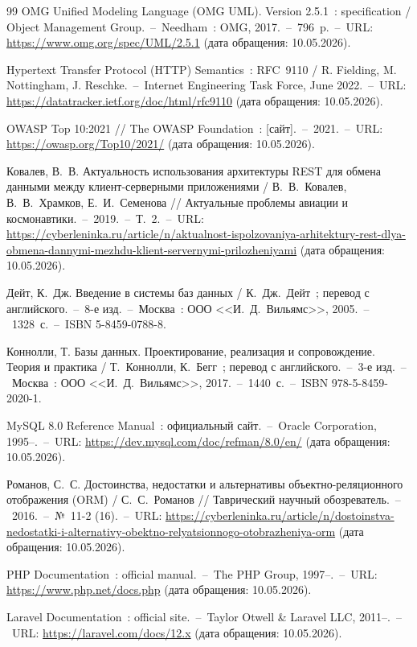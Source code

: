 \begin{thebibliography}{99}
 OMG Unified Modeling Language (OMG UML). Version 2.5.1~: specification / Object Management Group.~--~Needham~: OMG, 2017.~--~796~p.~--~URL: \url{https://www.omg.org/spec/UML/2.5.1} (дата обращения: 10.05.2026).

 Hypertext Transfer Protocol (HTTP) Semantics~: RFC~9110 / R. Fielding, M. Nottingham, J. Reschke.~--~Internet Engineering Task Force, June 2022.~--~URL: \url{https://datatracker.ietf.org/doc/html/rfc9110} (дата обращения: 10.05.2026).

 OWASP Top 10:2021 // The OWASP Foundation~: [сайт].~--~2021.~--~URL: \url{https://owasp.org/Top10/2021/} (дата обращения: 10.05.2026).

 Ковалев, В.~В. Актуальность использования архитектуры REST для обмена данными между клиент-серверными приложениями / В.~В.~Ковалев, В.~В.~Храмков, Е.~И.~Семенова // Актуальные проблемы авиации и космонавтики.~--~2019.~--~Т.~2.~--~URL: \url{https://cyberleninka.ru/article/n/aktualnost-ispolzovaniya-arhitektury-rest-dlya-obmena-dannymi-mezhdu-klient-servernymi-prilozheniyami} (дата обращения: 10.05.2026).

 Дейт, К.~Дж. Введение в системы баз данных / К.~Дж.~Дейт~; перевод с английского.~--~8-е изд.~--~Москва~: ООО <<И.~Д.~Вильямс>>, 2005.~--~1328~с.~--~ISBN 5-8459-0788-8.

 Коннолли, Т. Базы данных. Проектирование, реализация и сопровождение. Теория и практика / Т.~Коннолли, К.~Бегг~; перевод с английского.~--~3-е изд.~--~Москва~: ООО <<И.~Д.~Вильямс>>, 2017.~--~1440~с.~--~ISBN 978-5-8459-2020-1.

 MySQL 8.0 Reference Manual~: официальный сайт.~--~Oracle Corporation, 1995--.~--~URL: \url{https://dev.mysql.com/doc/refman/8.0/en/} (дата обращения: 10.05.2026).

 Романов, С.~С. Достоинства, недостатки и альтернативы объектно-реляционного отображения (ORM) / С.~С.~Романов // Таврический научный обозреватель.~--~2016.~--~№~11-2 (16).~--~URL: \url{https://cyberleninka.ru/article/n/dostoinstva-nedostatki-i-alternativy-obektno-relyatsionnogo-otobrazheniya-orm} (дата обращения: 10.05.2026).

 PHP Documentation~: official manual.~--~The PHP Group, 1997--.~--~URL: \url{https://www.php.net/docs.php} (дата обращения: 10.05.2026).

 Laravel Documentation~: official site.~--~Taylor Otwell \& Laravel LLC, 2011--.~--~URL: \url{https://laravel.com/docs/12.x} (дата обращения: 10.05.2026).


\end{thebibliography}
